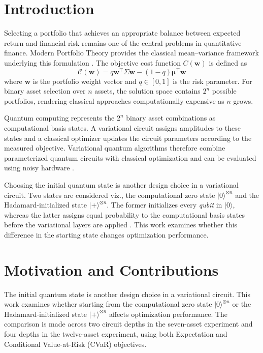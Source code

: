 \documentclass[runningheads]{llncs}
\begin{document}
\section{Introduction}
Selecting a portfolio that achieves an appropriate balance between expected return and financial risk remains one of the central problems in quantitative finance. Modern Portfolio Theory provides the classical mean--variance framework underlying this formulation \cite{markowitz1952}. The objective cost function $C(\mathbf{w})$ is defined as
\begin{equation}
    \mathcal{C}(\mathbf{w}) = q\mathbf{w}^\top \Sigma \mathbf{w} 
    - (1 - q)\boldsymbol{\mu}^\top \mathbf{w}
\end{equation}
where $\mathbf{w}$ is the portfolio weight vector and $q\in [0,1]$ is the risk parameter. For binary asset selection over $n$ assets, the solution space contains $2^n$ possible portfolios, rendering classical approaches computationally expensive as $n$ grows.

Quantum computing represents the $2^n$ binary asset combinations as computational basis states. A variational circuit assigns amplitudes to these states and a classical optimizer updates the circuit parameters according to the measured objective. Variational quantum algorithms therefore combine parameterized quantum circuits with classical optimization and can be evaluated using noisy hardware \cite{cerezo2021variational,preskill2018nisq}.

Choosing the initial quantum state is another design choice in a variational circuit. Two states are considered viz., the computational zero state $|0\rangle^{\otimes n}$ and the Hadamard-initialized state $|+\rangle^{\otimes n}$. The former initializes every \emph{qubit} in $|0\rangle$, whereas the latter assigns equal probability to the computational basis states before the variational layers are applied \cite{nielsen2010}. This work examines whether this difference in the starting state changes optimization performance.

\section{Motivation and Contributions}

The initial quantum state is another design choice in a variational circuit. This work examines whether starting from the computational zero state $|0\rangle^{\otimes n}$ or the Hadamard-initialized state $|+\rangle^{\otimes n}$ affects optimization performance. The comparison is made across two circuit depths in the seven-asset experiment and four depths in the twelve-asset experiment, using both Expectation and Conditional Value-at-Risk (CVaR) objectives.
\end{document}
